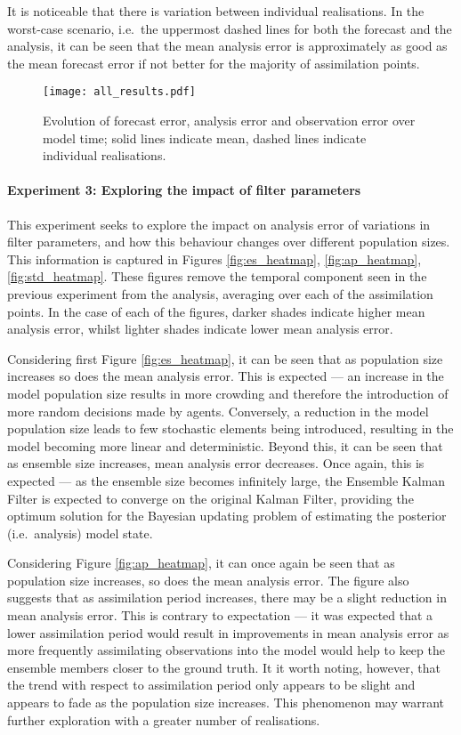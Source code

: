 It is noticeable that there is variation between individual realisations.
In the worst-case scenario, i.e.\ the uppermost dashed lines for both the
forecast and the analysis, it can be seen that the mean analysis error is
approximately as good as the mean forecast error if not better for the majority
of assimilation points.

\begin{figure}[!hp]
    \centering
    \texttt{[image: all\_results.pdf]}
    \caption{Evolution of forecast error, analysis error and observation error
    over model time; solid lines indicate mean, dashed lines indicate individual
realisations.}\label{fig:error_evolution}
\end{figure}

\paragraph{Experiment 3: Exploring the impact of filter parameters}

This experiment seeks to explore the impact on analysis error of variations in
filter parameters, and how this behaviour changes over different population
sizes.
This information is captured in Figures \ref{fig:es_heatmap},
\ref{fig:ap_heatmap}, \ref{fig:std_heatmap}.
These figures remove the temporal component seen in the previous experiment from
the analysis, averaging over each of the assimilation points.
In the case of each of the figures, darker shades indicate higher mean analysis
error, whilst lighter shades indicate lower mean analysis error.

Considering first Figure \ref{fig:es_heatmap}, it can be seen that as population
size increases so does the mean analysis error.
This is expected --- an increase in the model population size results in more
crowding and therefore the introduction of more random decisions made by agents.
Conversely, a reduction in the model population size leads to few stochastic
elements being introduced, resulting in the model becoming more linear and
deterministic.
Beyond this, it can be seen that as ensemble size increases, mean analysis error
decreases.
Once again, this is expected --- as the ensemble size becomes infinitely large,
the Ensemble Kalman Filter is expected to converge on the original Kalman
Filter, providing the optimum solution for the Bayesian updating problem of
estimating the posterior (i.e.\ analysis) model state.

Considering Figure \ref{fig:ap_heatmap}, it can once again be seen that as
population size increases, so does the mean analysis error.
The figure also suggests that as assimilation period increases, there may be a
slight reduction in mean analysis error.
This is contrary to expectation --- it was expected that a lower assimilation
period would result in improvements in mean analysis error as more frequently
assimilating observations into the model would help to keep the ensemble members
closer to the ground truth.
It it worth noting, however, that the trend with respect to assimilation period
only appears to be slight and appears to fade as the population size increases.
This phenomenon may warrant further exploration with a greater number of
realisations.

